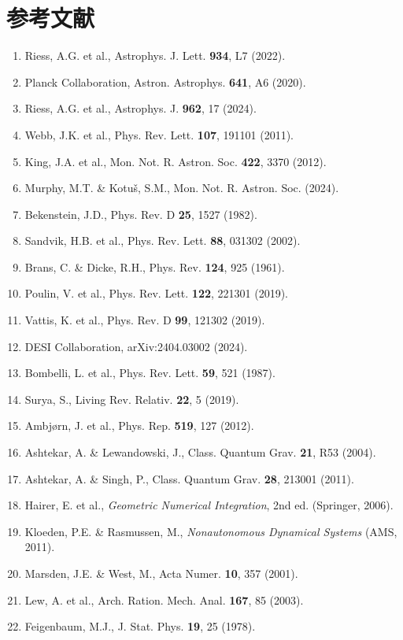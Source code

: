 \documentclass[a4paper,11pt]{article}
\theoremstyle{plain}
\begin{document}
\section*{参考文献}
\small
\begin{enumerate}
\item Riess, A.G. et al., Astrophys. J. Lett. \textbf{934}, L7 (2022).
\item Planck Collaboration, Astron. Astrophys. \textbf{641}, A6 (2020).
\item Riess, A.G. et al., Astrophys. J. \textbf{962}, 17 (2024).
\item Webb, J.K. et al., Phys. Rev. Lett. \textbf{107}, 191101 (2011).
\item King, J.A. et al., Mon. Not. R. Astron. Soc. \textbf{422}, 3370 (2012).
\item Murphy, M.T. \& Kotu\v{s}, S.M., Mon. Not. R. Astron. Soc. (2024).
\item Bekenstein, J.D., Phys. Rev. D \textbf{25}, 1527 (1982).
\item Sandvik, H.B. et al., Phys. Rev. Lett. \textbf{88}, 031302 (2002).
\item Brans, C. \& Dicke, R.H., Phys. Rev. \textbf{124}, 925 (1961).
\item Poulin, V. et al., Phys. Rev. Lett. \textbf{122}, 221301 (2019).
\item Vattis, K. et al., Phys. Rev. D \textbf{99}, 121302 (2019).
\item DESI Collaboration, arXiv:2404.03002 (2024).
\item Bombelli, L. et al., Phys. Rev. Lett. \textbf{59}, 521 (1987).
\item Surya, S., Living Rev. Relativ. \textbf{22}, 5 (2019).
\item Ambj{\o}rn, J. et al., Phys. Rep. \textbf{519}, 127 (2012).
\item Ashtekar, A. \& Lewandowski, J., Class. Quantum Grav. \textbf{21}, R53 (2004).
\item Ashtekar, A. \& Singh, P., Class. Quantum Grav. \textbf{28}, 213001 (2011).
\item Hairer, E. et al., \textit{Geometric Numerical Integration}, 2nd ed. (Springer, 2006).
\item Kloeden, P.E. \& Rasmussen, M., \textit{Nonautonomous Dynamical Systems} (AMS, 2011).
\item Marsden, J.E. \& West, M., Acta Numer. \textbf{10}, 357 (2001).
\item Lew, A. et al., Arch. Ration. Mech. Anal. \textbf{167}, 85 (2003).
\item Feigenbaum, M.J., J. Stat. Phys. \textbf{19}, 25 (1978).

\end{enumerate}
\end{document}
